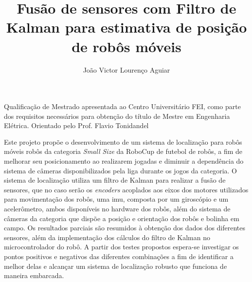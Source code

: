 \documentclass[acronym, symbols, table]{fei}
\title{Fusão de sensores com Filtro de Kalman para estimativa de posição de robôs móveis}
\author{João Victor Lourenço Aguiar}
\begin{document}
	
\maketitle

\begin{folhaderosto}
	Qualificação de Mestrado apresentada ao Centro Universitário FEI, como parte dos requisitos necessários para obtenção do título de Mestre em Engenharia Elétrica. Orientado pelo Prof. Flavio Tonidandel
\end{folhaderosto}
	
\begin{resumo}
	

	Este projeto propõe o desenvolvimento de um sistema de localização para robôs móveis robôs da categoria \textit{Small Size} da RoboCup de futebol de robôs, a fim de melhorar seu posicionamento ao realizarem jogadas e diminuir a dependência do sistema de câmeras disponibilizados pela liga durante os jogos da categoria. O sistema de localização utiliza um filtro de Kalman para realizar a fusão de sensores, que no caso serão os \textit{encoders} acoplados aos eixos dos motores utilizados para movimentação dos robôs, uma \acrshort{imu}, composta por um giroscópio e um acelerômetro, ambos disponíveis no hardware dos robôs, além do sistema de câmeras da categoria que dispõe a posição e orientação dos robôs e bolinha em campo. Os resultados parciais são resumidos à obtenção dos dados dos diferentes sensores, além da implementação dos cálculos do filtro de Kalman no microcontrolador do robô. A partir dos testes propostos espera-se investigar os pontos positivos e negativos das diferentes combinações a fim de identificar a melhor delas e alcançar um sistema de localização robusto que funciona de maneira embarcada.
	

\end{resumo}
\end{document}
